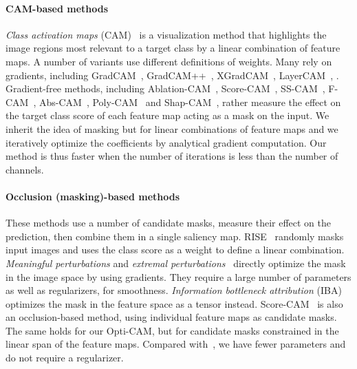 
\paragraph{CAM-based methods}

\emph{Class activation maps} (CAM)~\citep{zhou2016learning} is a visualization method that highlights the image regions most relevant to a target class by a linear combination of feature maps. A number of variants use different definitions of weights. Many rely on gradients, including GradCAM~\citep{selvaraju2017grad}, GradCAM++~\citep{chattopadhay2018grad}, XGradCAM~\citep{fu2020axiom}, LayerCAM~\citep{jiang2021layercam}, . Gradient-free methods, including Ablation-CAM~\citep{ramaswamy2020ablation}, Score-CAM~\cite{wang2020score}, SS-CAM~\citep{wang2020ss}, F-CAM~\citep{belharbi2022f}, Abs-CAM~\citep{zeng2023abs}, Poly-CAM~\citep{englebert2022poly} and Shap-CAM~\citep{zheng2022shap}, rather measure the effect on the target class score of each feature map acting as a mask on the input. We inherit the idea of masking but for linear combinations of feature maps and we iteratively optimize the coefficients by analytical gradient computation. Our method is thus faster when the number of iterations is less than the number of channels.


\paragraph{Occlusion (masking)-based methods}

These methods use a number of candidate masks, measure their effect on the prediction, then combine them in a single saliency map. RISE~\citep{petsiuk2018rise} randomly masks input images and uses the class score as a weight to define a linear combination. \emph{Meaningful perturbations} \citep{fong2017interpretable} and \emph{extremal perturbations}~\citep{fong2019understanding} directly optimize the mask in the image space by using gradients. They require a large number of parameters as well as regularizers, \eg for smoothness. \emph{Information bottleneck attribution} (IBA)~\citep{schulz2020restricting} optimizes the mask in the feature space as a tensor instead. Score-CAM~\cite{wang2020score} is also an occlusion-based method, using individual feature maps as candidate masks. The same holds for our Opti-CAM, but for candidate masks constrained in the linear span of the feature maps. Compared with~\citep{fong2019understanding,schulz2020restricting}, we have fewer parameters and do not require a regularizer.


